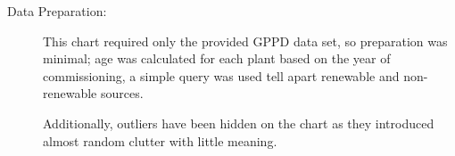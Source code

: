 \begin{description}
\item[Data Preparation:]
This chart required only the provided GPPD data set, so preparation was minimal; age was calculated for each plant based on the year of commissioning, a simple query was used tell apart renewable and non-renewable sources.

Additionally, outliers have been hidden on the chart as they introduced almost random clutter with little meaning.

\end{description}

